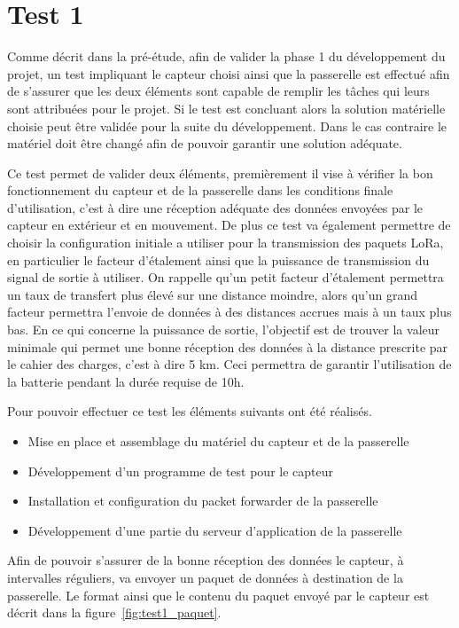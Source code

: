 \chapter{Test 1}

Comme décrit dans la pré-étude, afin de valider la phase 1 du développement du projet, un test impliquant le capteur choisi ainsi que la passerelle est effectué afin de s'assurer que les deux éléments sont capable de remplir les tâches qui leurs sont attribuées pour le projet. Si le test est concluant alors la solution matérielle choisie peut être validée pour la suite du développement. Dans le cas contraire le matériel doit être changé afin de pouvoir garantir une solution adéquate.

Ce test permet de valider deux éléments, premièrement il vise à vérifier la bon fonctionnement du capteur et de la passerelle dans les conditions finale d'utilisation, c'est à dire une réception adéquate des données envoyées par le capteur en extérieur et en mouvement. De plus ce test va également permettre de choisir la configuration initiale a utiliser pour la transmission des paquets LoRa, en particulier le facteur d'étalement ainsi que la puissance de transmission du signal de sortie à utiliser. On rappelle qu'un petit facteur d'étalement permettra un taux de transfert plus élevé sur une distance moindre, alors qu'un grand facteur permettra l'envoie de données à des distances accrues mais à un taux plus bas. En ce qui concerne la puissance de sortie, l'objectif est de trouver la valeur minimale qui permet une bonne réception des données à la distance prescrite par le cahier des charges, c'est à dire 5 km. Ceci permettra de garantir l'utilisation de la batterie pendant la durée requise de 10h.

Pour pouvoir effectuer ce test les éléments suivants ont été réalisés.

\begin{itemize}
\item Mise en place et assemblage du matériel du capteur et de la passerelle
\item Développement d'un programme de test pour le capteur
\item Installation et configuration du packet forwarder de la passerelle
\item Développement d'une partie du serveur d'application de la passerelle
\end{itemize}

Afin de pouvoir s'assurer de la bonne réception des données le capteur, à intervalles réguliers, va envoyer un paquet de données à destination de la passerelle. Le format ainsi que le contenu du paquet envoyé par le capteur est décrit dans la figure~\ref{fig:test1_paquet}.

